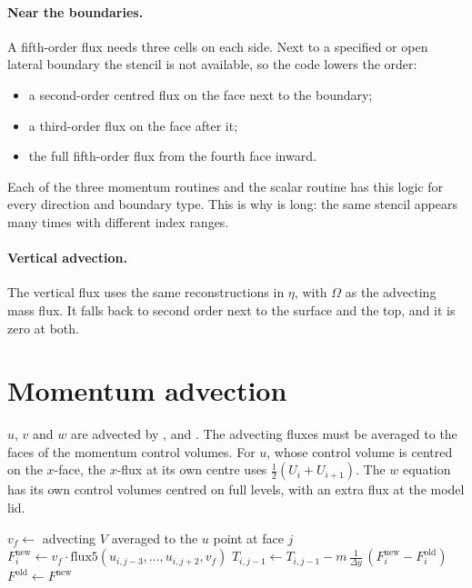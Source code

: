 \paragraph{Near the boundaries.} A fifth-order flux needs three cells on each side. Next to a specified or open
lateral boundary the stencil is not available, so the code lowers the order:
\begin{itemize}
  \item a second-order centred flux on the face next to the boundary;
  \item a third-order flux on the face after it;
  \item the full fifth-order flux from the fourth face inward.
\end{itemize}
Each of the three momentum routines and the scalar routine has this logic for every direction and boundary type. This
is why  is long: the same stencil appears many times with different index ranges.

\paragraph{Vertical advection.} The vertical flux uses the same reconstructions in $\eta$, with $\Omega$ as the
advecting mass flux. It falls back to second order next to the surface and the top, and it is zero at both.

\section{Momentum advection}

$u$, $v$ and $w$ are advected by ,  and .
The advecting fluxes must be averaged to the faces of the momentum control volumes. For $u$, whose control volume is
centred on the $x$-face, the $x$-flux at its own centre uses $\frac12(U_{i} + U_{i+1})$. The $w$ equation has its
own control volumes centred on full levels, with an extra flux at the model lid.

\begin{algorithm}[ht]
\caption{The $y$-flux part of  as written for a CPU (one $k$ level shown). The face flux of row $j$
is kept in a one-row buffer and reused as the lower flux of row $j+1$.}
\label{alg:advect-y}
\begin{algorithmic}[1]
 
    \State $v_f \gets$ advecting $V$ averaged to the $u$ point at face $j$
    \State $F^{\mathrm{new}}_i \gets v_f \cdot \mathrm{flux5}(u_{i,j-3}, \dots, u_{i,j+2}, v_f)$ 
  \EndFor
      \State $T_{i,j-1} \gets T_{i,j-1} - m\,\frac{1}{\Delta y}\,(F^{\mathrm{new}}_i - F^{\mathrm{old}}_i)$
    \EndFor
  \EndIf
  \State $F^{\mathrm{old}} \gets F^{\mathrm{new}}$ 
\EndFor
\end{algorithmic}
\end{algorithm}

